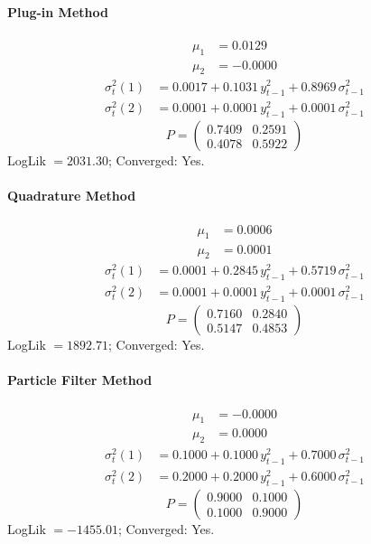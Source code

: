 \documentclass[11pt, a4paper]{article}
\begin{document}
\paragraph{Plug-in Method}
\begin{align}
\mu_{1} &= 0.0129 \\
\mu_{2} &= -0.0000
\end{align}
\begin{align}
\sigma^2_{t}(1) &= 0.0017 + 0.1031\, y_{t-1}^2 + 0.8969\, \sigma^2_{t-1} \\
\sigma^2_{t}(2) &= 0.0001 + 0.0001\, y_{t-1}^2 + 0.0001\, \sigma^2_{t-1}
\end{align}
\begin{equation}
P = \begin{pmatrix} 0.7409 & 0.2591 \\ 0.4078 & 0.5922 \end{pmatrix}
\end{equation}
LogLik $= 2031.30$; Converged: Yes.

\paragraph{Quadrature Method}
\begin{align}
\mu_{1} &= 0.0006 \\
\mu_{2} &= 0.0001
\end{align}
\begin{align}
\sigma^2_{t}(1) &= 0.0001 + 0.2845\, y_{t-1}^2 + 0.5719\, \sigma^2_{t-1} \\
\sigma^2_{t}(2) &= 0.0001 + 0.0001\, y_{t-1}^2 + 0.0001\, \sigma^2_{t-1}
\end{align}
\begin{equation}
P = \begin{pmatrix} 0.7160 & 0.2840 \\ 0.5147 & 0.4853 \end{pmatrix}
\end{equation}
LogLik $= 1892.71$; Converged: Yes.

\paragraph{Particle Filter Method}
\begin{align}
\mu_{1} &= -0.0000 \\
\mu_{2} &= 0.0000
\end{align}
\begin{align}
\sigma^2_{t}(1) &= 0.1000 + 0.1000\, y_{t-1}^2 + 0.7000\, \sigma^2_{t-1} \\
\sigma^2_{t}(2) &= 0.2000 + 0.2000\, y_{t-1}^2 + 0.6000\, \sigma^2_{t-1}
\end{align}
\begin{equation}
P = \begin{pmatrix} 0.9000 & 0.1000 \\ 0.1000 & 0.9000 \end{pmatrix}
\end{equation}
LogLik $= -1455.01$; Converged: Yes.
\end{document}
